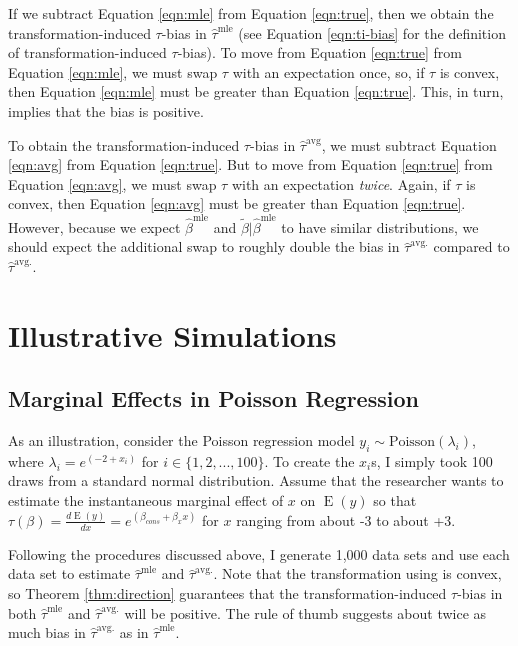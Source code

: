 \documentclass[10pt]{article}
\DeclareMathOperator*{\E}{\text{E}}
\begin{document}
If we subtract Equation \ref{eqn:mle} from Equation \ref{eqn:true}, then we obtain the transformation-induced $\tau$-bias in $\hat{\tau}^\text{mle}$ (see Equation \ref{eqn:ti-bias} for the definition of transformation-induced $\tau$-bias). 
To move from Equation \ref{eqn:true} from Equation \ref{eqn:mle}, we must swap $\tau$ with an expectation once, so, if $\tau$ is convex, then Equation \ref{eqn:mle} must be greater than Equation \ref{eqn:true}.
This, in turn, implies that the bias is positive.

To obtain the transformation-induced $\tau$-bias in $\hat{\tau}^\text{avg}$, we must subtract Equation \ref{eqn:avg} from Equation \ref{eqn:true}. 
But to move from Equation \ref{eqn:true} from Equation \ref{eqn:avg}, we must swap $\tau$ with an expectation \emph{twice}. 
Again, if $\tau$ is convex, then Equation \ref{eqn:avg} must be greater than Equation \ref{eqn:true}.
However, because we expect $\hat{\beta}^\text{mle}$ and $\tilde{\beta} | \hat{\beta}^\text{mle}$ to have similar distributions, we should expect the additional swap to roughly double the bias in $\hat{\tau}^\text{avg.}$ compared to $\hat{\tau}^\text{avg.}$.

\section*{Illustrative Simulations}

\subsection*{Marginal Effects in Poisson Regression}

As an illustration, consider the Poisson regression model $y_i \sim \text{Poisson}(\lambda_i)$, where $\lambda_i = e^{(-2 + x_i)}$ for $i \in \{1, 2, ..., 100\}$. 
To create the $x_i$s, I simply took 100 draws from a standard normal distribution. 
Assume that the researcher wants to estimate the instantaneous marginal effect of $x$ on $\E(y)$ so that $\tau(\beta) = \frac{d \E (y)}{dx} = e^{(\beta_{cons} + \beta_x x)}$ for $x$ ranging from about -3 to about +3.

Following the procedures discussed above, I generate 1,000 data sets and use each data set to estimate $\hat{\tau}^\text{mle}$ and $\hat{\tau}^\text{avg.}$. 
Note that the transformation using is convex, so Theorem \ref{thm:direction} guarantees that the transformation-induced $\tau$-bias in both $\hat{\tau}^\text{mle}$ and $\hat{\tau}^\text{avg.}$ will be positive. The rule of thumb suggests about twice as much bias in $\hat{\tau}^\text{avg.}$ as in $\hat{\tau}^\text{mle}$. 
\end{document}
